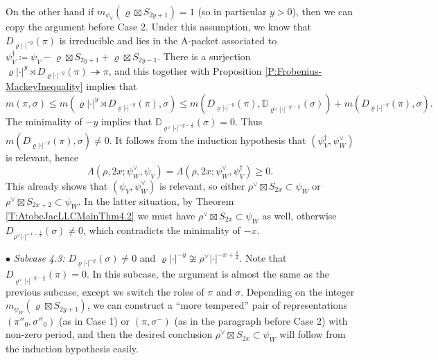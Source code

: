 \documentclass[11pt,letterpaper]{amsart}
\theoremstyle{plain}
\numberwithin{theorem}{section}
\numberwithin{equation}{subsection}
\theoremstyle{remark}
\newcommand{\D}{\mathbb{D}}
\begin{document}
\vskip 5pt

On the other hand if $m_{\psi_V}\left(\varrho\boxtimes S_{2y+1}\right)=1$ (so in particular $y>0$), then we can copy the argument before Case 2. Under this assumption, we know that $D_{\varrho|\cdot|^{-y}}\left(\pi\right)$ is irreducible and lies in the A-packet associated to $\psi_V^\dagger\coloneqq \psi_V - \varrho\boxtimes S_{2y+1} + \varrho\boxtimes S_{2y-1}$. There is a surjection $\varrho|\cdot|^y\rtimes D_{\varrho|\cdot|^{-y}}\left(\pi\right)\twoheadrightarrow \pi$, and this together with Proposition \ref{P:Frobenius-MackeyInequality} implies that
\[
    m\left(\pi,\sigma\right)\leq m\left(\varrho|\cdot|^y\rtimes D_{\varrho|\cdot|^{-y}}\left(\pi\right),\sigma\right)\leq m\left(D_{\varrho|\cdot|^{-y}}\left(\pi\right),\D_{\varrho^\vee|\cdot|^{-y-\frac{1}{2}}}\left(\sigma\right)\right) + m\left(D_{\varrho|\cdot|^{-y}}\left(\pi\right),\sigma\right).
\]
The minimality of $-y$ implies that $\D_{\varrho^\vee|\cdot|^{-y-\frac{1}{2}}}\left(\sigma\right)=0$. Thus $m\left(D_{\varrho|\cdot|^{-y}}\left(\pi\right),\sigma\right)\neq 0$. It follows from the induction hypothesis that $\left(\psi_V^\dagger,\psi_W^\vee\right)$ is relevant, hence
\[
    \Lambda\left(\rho,2x;\psi_W^\vee,\psi_V\right) = \Lambda\left(\rho,2x;\psi_W^\vee,\psi_V^\dagger\right)\geq 0.
\]
This already shows that $\left(\psi_V,\psi_W^\vee\right)$ is relevant, so either $\rho^\vee\boxtimes S_{2x}\subset \psi_W$ or $\rho^\vee \boxtimes S_{2x+2}\subset \psi_W$. In the latter situation, by Theorem \ref{T:AtobeJacLLCMainThm4.2} we must have $\rho^\vee\boxtimes S_{2x}\subset \psi_W$ as well, otherwise $D_{\rho^\vee|\cdot|^{-x-\frac{1}{2}}}\left(\sigma\right)\neq0$, which contradicts the minimality of $-x$.

\vskip 5pt

$\bullet$\textit{ Subcase 4.3:} $D_{\varrho|\cdot|^{-y}}\left(\sigma\right)\neq0$ and $\varrho|\cdot|^{-y}\not\cong\rho^\vee|\cdot|^{-x+\frac{1}{2}}$. Note that $D_{\varrho^\vee|\cdot|^{-y-\frac{1}{2}}}\left(\pi\right)=0$. In this subcase, the argument is almost the same as the previous subcase, except we switch the roles of $\pi$ and $\sigma$. Depending on the integer $m_{\psi_W}\left(\varrho\boxtimes S_{2y+1}\right)$, we can construct a ``more tempered'' pair of representations $\left(\pi''_0,\sigma''_0\right)$ (as in Case 1) or $\left(\pi,\sigma^-\right)$ (as in the paragraph before Case 2) with non-zero period, and then the desired conclusion $\rho^\vee\boxtimes S_{2x}\subset\psi_W$ will follow from the induction hypothesis easily.
\end{document}
